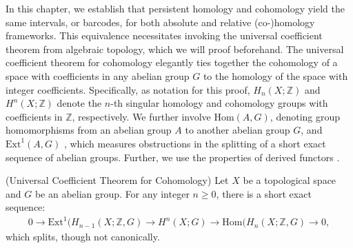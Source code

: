 In this chapter, we establish that persistent homology and cohomology yield the same intervals, or barcodes, for both absolute and relative (co-)homology frameworks. This equivalence necessitates invoking the universal coefficient theorem from algebraic topology, which we will proof beforehand. The universal coefficient theorem for cohomology elegantly ties together the cohomology of a space with coefficients in any abelian group $G$ to the homology of the space with integer coefficients. Specifically, as notation for this proof, $H_n(X;\mathbb{Z})$ and $H^n(X;\mathbb{Z})$ denote the $n$-th singular homology and cohomology groups with coefficients in $\mathbb{Z}$, respectively. We further involve $\text{Hom}(A, G)$, denoting group homomorphisms from an abelian group $A$ to another abelian group $G$, and $\text{Ext}^1(A, G)$ \cite{}, which measures obstructions in the splitting of a short exact sequence of abelian groups. Further, we use the properties of derived functors \cite{}.

\begin{theorem}{(Universal Coefficient Theorem for Cohomology) \cite[§3.1]{hatcher2005algebraic}}
\label{universalcoefficients}
Let $X$ be a topological space and $G$ be an abelian group. For any integer $n \geq 0$, there is a short exact sequence:
\begin{align*}
0 \rightarrow \text{Ext}^1(H_{n-1}(X;\mathbb{Z},G) \rightarrow H^n(X;G) \rightarrow \text{Hom}(H_n(X;\mathbb{Z},G) \rightarrow 0,
\end{align*}
which splits, though not canonically.
\end{theorem}

